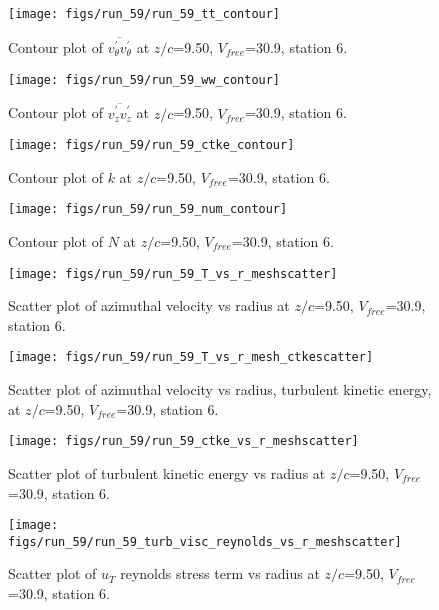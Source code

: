 \begin{figure}[H]
\centering
\texttt{[image: figs/run\_59/run\_59\_tt\_contour]}
\caption{Contour plot of $\overline{v_{\theta}^{\prime} v_{\theta}^{\prime}}$ at $z/c$=9.50, $V_{free}$=30.9, station 6.}
\end{figure}


\begin{figure}[H]
\centering
\texttt{[image: figs/run\_59/run\_59\_ww\_contour]}
\caption{Contour plot of $\overline{v_{z}^{\prime} v_{z}^{\prime}}$ at $z/c$=9.50, $V_{free}$=30.9, station 6.}
\end{figure}


\begin{figure}[H]
\centering
\texttt{[image: figs/run\_59/run\_59\_ctke\_contour]}
\caption{Contour plot of $k$ at $z/c$=9.50, $V_{free}$=30.9, station 6.}
\end{figure}


\begin{figure}[H]
\centering
\texttt{[image: figs/run\_59/run\_59\_num\_contour]}
\caption{Contour plot of $N$ at $z/c$=9.50, $V_{free}$=30.9, station 6.}
\end{figure}


\begin{figure}[H]
\centering
\texttt{[image: figs/run\_59/run\_59\_T\_vs\_r\_meshscatter]}
\caption{Scatter plot of azimuthal velocity vs radius at $z/c$=9.50, $V_{free}$=30.9, station 6.}
\end{figure}


\begin{figure}[H]
\centering
\texttt{[image: figs/run\_59/run\_59\_T\_vs\_r\_mesh\_ctkescatter]}
\caption{Scatter plot of azimuthal velocity vs radius, turbulent kinetic energy, at $z/c$=9.50, $V_{free}$=30.9, station 6.}
\end{figure}


\begin{figure}[H]
\centering
\texttt{[image: figs/run\_59/run\_59\_ctke\_vs\_r\_meshscatter]}
\caption{Scatter plot of turbulent kinetic energy vs radius at $z/c$=9.50, $V_{free}$=30.9, station 6.}
\end{figure}


\begin{figure}[H]
\centering
\texttt{[image: figs/run\_59/run\_59\_turb\_visc\_reynolds\_vs\_r\_meshscatter]}
\caption{Scatter plot of $
u_T$ reynolds stress term vs radius at $z/c$=9.50, $V_{free}$=30.9, station 6.}
\end{figure}


